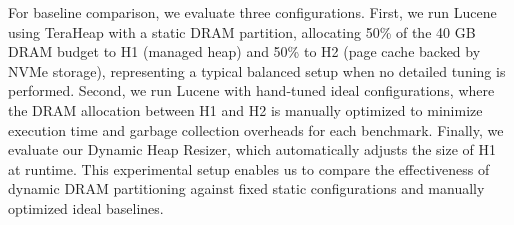For baseline comparison, we evaluate three configurations. First, we run Lucene using TeraHeap with a static DRAM partition, allocating 50\% of the 40 GB DRAM budget to H1 (managed heap) and 50\% to H2 (page cache backed by NVMe storage), representing a typical balanced setup when no detailed tuning is performed. Second, we run Lucene with hand-tuned ideal configurations, where the DRAM allocation between H1 and H2 is manually optimized to minimize execution time and garbage collection overheads for each benchmark. Finally, we evaluate our Dynamic Heap Resizer, which automatically adjusts the size of H1 at runtime. This experimental setup enables us to compare the effectiveness of dynamic DRAM partitioning against fixed static configurations and manually optimized ideal baselines.

